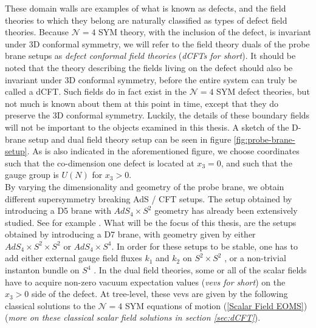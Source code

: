 These domain walls are examples of what is known as defects, and the field theories to which they belong are naturally classified as types of defect field theories. Because $\mathcal{N} = 4$ SYM theory, with the inclusion of the defect, is invariant under 3D conformal symmetry, we will refer to the field theory duals of the probe brane setups as \textit{defect conformal field theories} (\textit{dCFTs for short}). It should be noted that the theory describing the fields living on the defect should also be invariant under 3D conformal symmetry, before the entire system can truly be called a dCFT. Such fields do in fact exist in the $\mathcal{N}=4$ SYM defect theories, but not much is known about them at this point in time, except that they do preserve the 3D conformal symmetry. Luckily, the details of these boundary fields will not be important to the objects examined in this thesis. A sketch of the D-brane setup and dual field theory setup can be seen in figure \ref{fig:probe-brane-setup}. As is also indicated in the aforementioned figure, we choose coordinates such that the co-dimension one defect is located at $x_3 = 0$, and such that the gauge group is $U(N)$ for $x_3 > 0$.\\
By varying the dimensionality and geometry of the probe brane, we obtain different supersymmetry breaking AdS / CFT setups. The setup obtained by introducing a D5 brane with $AdS_4 \times S^2$ geometry has already been extensively studied. See for example \cite{One-point functions in D5-D3, Two-point functions in D5-D3, MPS bethe state overlap, non-protected one-point functions, Length L length 2 two-point functions D5-D3}. What will be the focus of this thesis, are the setups obtained by introducing a D7 brane, with geometry given by either $AdS_4 \times S^2 \times S^2$ or $AdS_4 \times S^4$. In order for these setups to be stable, one has to add either external gauge field fluxes $k_1$ and $k_2$ on $S^2 \times S^2$ \cite{Stabilization so(3)xso(3)}, or a non-trivial instanton bundle on $S^4$ \cite{Stabilization so(5)}. In the dual field theories, some or all of the scalar fields have to acquire non-zero vacuum expectation values (\textit{vevs for short}) on the $x_3 > 0$ side of the defect. At tree-level, these vevs are given by the following classical solutions to the $\mathcal{N}=4$ SYM equations of motion (\ref{Scalar Field EOMS}) (\textit{more on these classical scalar field solutions in section \ref{sec:dCFT}}).
%
%
